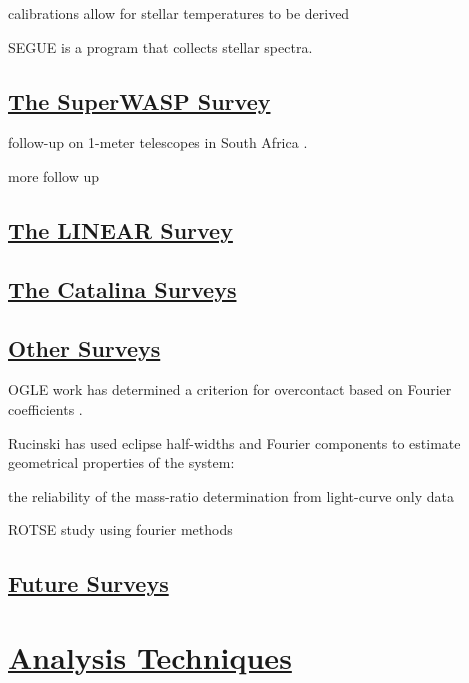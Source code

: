 \documentclass[12pt]{article} %
\numberwithin{equation}{section} %
\begin{document}
calibrations allow for stellar temperatures to be derived \cite{fukugita2011characterization}

SEGUE is a program that collects stellar spectra.

\subsection[The SuperWASP Survey]{\hyperlink{toc}{The SuperWASP Survey}}

follow-up on 1-meter telescopes in South Africa \citep{koen2016multi}.

more follow up \citep{darwish2016orbital}

\subsection[The LINEAR Survey]{\hyperlink{toc}{The LINEAR Survey}}

\subsection[The Catalina Surveys]{\hyperlink{toc}{The Catalina Surveys}}

\subsection[Other Surveys]{\hyperlink{toc}{Other Surveys}}

OGLE work has determined a criterion for overcontact based on Fourier coefficients \citep{rucinski1997eclipsing}. \citep{rucinski1993simple}

Rucinski has used eclipse half-widths and Fourier components to estimate geometrical properties of the system:

\citep{rucinski1973w}

the reliability of the mass-ratio determination from light-curve only data \citep{hambalek2013reliability}

ROTSE study using fourier methods \citep{coker2013study}

\subsection[Future Surveys]{\hyperlink{toc}{Future Surveys}}



\section[Analysis Techniques]{\hyperlink{toc}{Analysis Techniques}} \label{sec: analysis_techniques}
\end{document}
